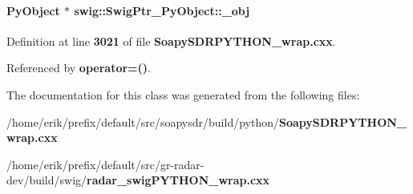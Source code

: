 \paragraph[{\+\_\+obj}]{\setlength{\rightskip}{0pt plus 5cm}Py\+Object $\ast$ swig\+::\+Swig\+Ptr\+\_\+\+Py\+Object\+::\+\_\+obj\hspace{0.3cm}{\ttfamily [protected]}}\label{classswig_1_1SwigPtr__PyObject_abb14c2948572bd4bf429540f7770831e}


Definition at line {\bf 3021} of file {\bf Soapy\+S\+D\+R\+P\+Y\+T\+H\+O\+N\+\_\+wrap.\+cxx}.



Referenced by {\bf operator=()}.



The documentation for this class was generated from the following files\+:\begin{DoxyCompactItemize}
\item 
/home/erik/prefix/default/src/soapysdr/build/python/{\bf Soapy\+S\+D\+R\+P\+Y\+T\+H\+O\+N\+\_\+wrap.\+cxx}\item 
/home/erik/prefix/default/src/gr-\/radar-\/dev/build/swig/{\bf radar\+\_\+swig\+P\+Y\+T\+H\+O\+N\+\_\+wrap.\+cxx}\end{DoxyCompactItemize}
